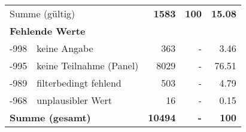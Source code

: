 \begin{longtable}{lXrrr}
     \midrule
     \multicolumn{2}{l}{Summe (gültig)} &
       \textbf{\num{1583}} &
     \textbf{100} &
       \textbf{\num[round-mode=places,round-precision=2]{15,08}} \\
     \multicolumn{5}{l}{\textbf{Fehlende Werte}}\\
       -998 &
       keine Angabe &
         \num{363} &
        - &
         \num[round-mode=places,round-precision=2]{3,46} \\
       -995 &
       keine Teilnahme (Panel) &
         \num{8029} &
        - &
         \num[round-mode=places,round-precision=2]{76,51} \\
       -989 &
       filterbedingt fehlend &
         \num{503} &
        - &
         \num[round-mode=places,round-precision=2]{4,79} \\
       -968 &
       unplausibler Wert &
         \num{16} &
        - &
         \num[round-mode=places,round-precision=2]{0,15} \\
     \midrule
     \multicolumn{2}{l}{\textbf{Summe (gesamt)}} &
          \textbf{\num{10494}} &
        \textbf{-} &
        \textbf{100} \\
     \bottomrule
     \end{longtable}
     
